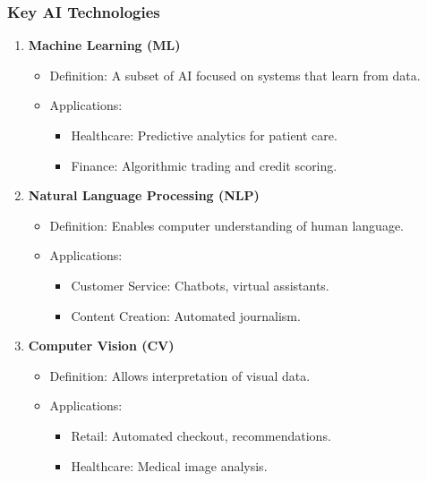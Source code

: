 \documentclass{beamer}
\begin{document}
\begin{frame}[fragile]
    \frametitle{Key AI Technologies}
    \begin{enumerate}
        \item \textbf{Machine Learning (ML)}
            \begin{itemize}
                \item Definition: A subset of AI focused on systems that learn from data.
                \item Applications:
                    \begin{itemize}
                        \item Healthcare: Predictive analytics for patient care.
                        \item Finance: Algorithmic trading and credit scoring.
                    \end{itemize}
            \end{itemize}
        \item \textbf{Natural Language Processing (NLP)}
            \begin{itemize}
                \item Definition: Enables computer understanding of human language.
                \item Applications:
                    \begin{itemize}
                        \item Customer Service: Chatbots, virtual assistants.
                        \item Content Creation: Automated journalism.
                    \end{itemize}
            \end{itemize}
        \item \textbf{Computer Vision (CV)}
            \begin{itemize}
                \item Definition: Allows interpretation of visual data.
                \item Applications:
                    \begin{itemize}
                        \item Retail: Automated checkout, recommendations.
                        \item Healthcare: Medical image analysis.
                    \end{itemize}
            \end{itemize}
    \end{enumerate}
\end{frame}
\end{document}
